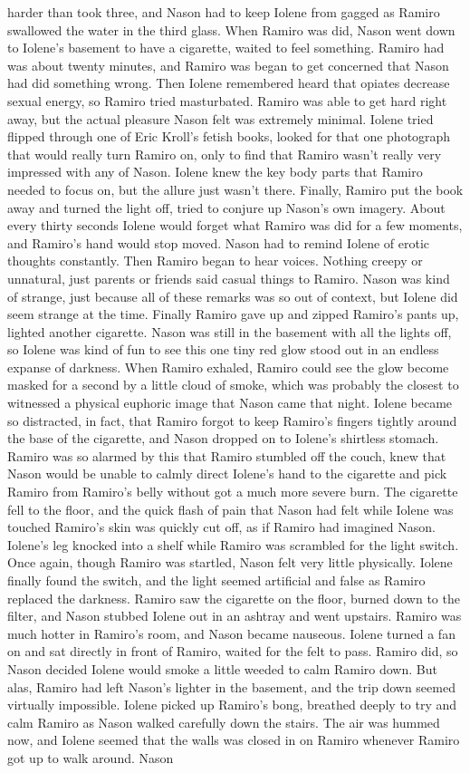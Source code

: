 \documentclass[12pt]{book}
\begin{document}
harder than took three, and Nason had to keep Iolene from gagged as Ramiro swallowed the water in the third glass. When Ramiro was did, Nason went down to Iolene's basement to have a cigarette, waited to feel something. Ramiro had was about twenty minutes, and Ramiro was began to get concerned that Nason had did something wrong. Then Iolene remembered heard that opiates decrease sexual energy, so Ramiro tried masturbated. Ramiro was able to get hard right away, but the actual pleasure Nason felt was extremely minimal. Iolene tried flipped through one of Eric Kroll's fetish books, looked for that one photograph that would really turn Ramiro on, only to find that Ramiro wasn't really very impressed with any of Nason. Iolene knew the key body parts that Ramiro needed to focus on, but the allure just wasn't there. Finally, Ramiro put the book away and turned the light off, tried to conjure up Nason's own imagery. About every thirty seconds Iolene would forget what Ramiro was did for a few moments, and Ramiro's hand would stop moved. Nason had to remind Iolene of erotic thoughts constantly. Then Ramiro began to hear voices. Nothing creepy or unnatural, just parents or friends said casual things to Ramiro. Nason was kind of strange, just because all of these remarks was so out of context, but Iolene did seem strange at the time. Finally Ramiro gave up and zipped Ramiro's pants up, lighted another cigarette. Nason was still in the basement with all the lights off, so Iolene was kind of fun to see this one tiny red glow stood out in an endless expanse of darkness. When Ramiro exhaled, Ramiro could see the glow become masked for a second by a little cloud of smoke, which was probably the closest to witnessed a physical euphoric image that Nason came that night. Iolene became so distracted, in fact, that Ramiro forgot to keep Ramiro's fingers tightly around the base of the cigarette, and Nason dropped on to Iolene's shirtless stomach. Ramiro was so alarmed by this that Ramiro stumbled off the couch, knew that Nason would be unable to calmly direct Iolene's hand to the cigarette and pick Ramiro from Ramiro's belly without got a much more severe burn. The cigarette fell to the floor, and the quick flash of pain that Nason had felt while Iolene was touched Ramiro's skin was quickly cut off, as if Ramiro had imagined Nason. Iolene's leg knocked into a shelf while Ramiro was scrambled for the light switch. Once again, though Ramiro was startled, Nason felt very little physically. Iolene finally found the switch, and the light seemed artificial and false as Ramiro replaced the darkness. Ramiro saw the cigarette on the floor, burned down to the filter, and Nason stubbed Iolene out in an ashtray and went upstairs. Ramiro was much hotter in Ramiro's room, and Nason became nauseous. Iolene turned a fan on and sat directly in front of Ramiro, waited for the felt to pass. Ramiro did, so Nason decided Iolene would smoke a little weeded to calm Ramiro down. But alas, Ramiro had left Nason's lighter in the basement, and the trip down seemed virtually impossible. Iolene picked up Ramiro's bong, breathed deeply to try and calm Ramiro as Nason walked carefully down the stairs. The air was hummed now, and Iolene seemed that the walls was closed in on Ramiro whenever Ramiro got up to walk around. Nason 
\end{document}
